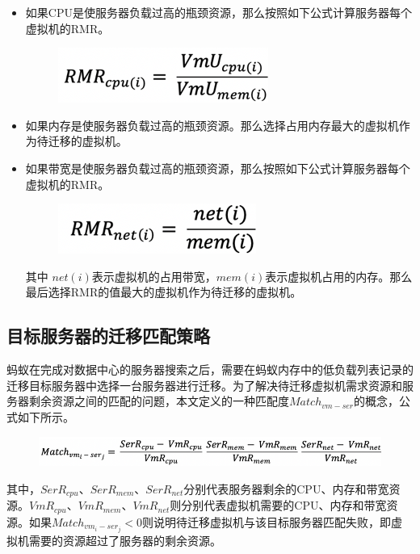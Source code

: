 \begin{itemize}
 \item 如果CPU是使服务器负载过高的瓶颈资源，那么按照如下公式计算服务器每个虚拟机的RMR。

        \begin{figure}[!htb]
          \centering
          \includegraphics{./Figure/IMG_Chap3_12.png}
        \end{figure}

 \item 如果内存是使服务器负载过高的瓶颈资源。那么选择占用内存最大的虚拟机作为待迁移的虚拟机。
 \item 如果带宽是使服务器负载过高的瓶颈资源，那么按照如下公式计算服务器每个虚拟机的RMR。

        \begin{figure}[!htb]
          \centering
          \includegraphics{./Figure/IMG_Chap3_13.png}
        \end{figure}

        其中 $ net(i) $表示虚拟机的占用带宽，$ mem(i) $表示虚拟机占用的内存。那么最后选择RMR的值最大的虚拟机作为待迁移的虚拟机。
 \end{itemize}

\subsection{目标服务器的迁移匹配策略}
蚂蚁在完成对数据中心的服务器搜索之后，需要在蚂蚁内存中的低负载列表记录的迁移目标服务器中选择一台服务器进行迁移。为了解决待迁移虚拟机需求资源和服务器剩余资源之间的匹配的问题，本文定义的一种匹配度$ Match_{vm-ser} $的概念，公式如下所示。

\begin{figure}[htp]
  \centering
  \includegraphics{./Figure/IMG_Chap3_14.png}
\end{figure}

其中，$ SerR_{cpu} $、$ SerR_{mem} $、$ SerR_{net} $分别代表服务器剩余的CPU、内存和带宽资源。$ VmR_{cpu} $、$ VmR_{mem} $、$ VmR_{net} $则分别代表虚拟机需要的CPU、内存和带宽资源。如果$ Match_{vm_i-ser_j} < 0 $则说明待迁移虚拟机与该目标服务器匹配失败，即虚拟机需要的资源超过了服务器的剩余资源。

